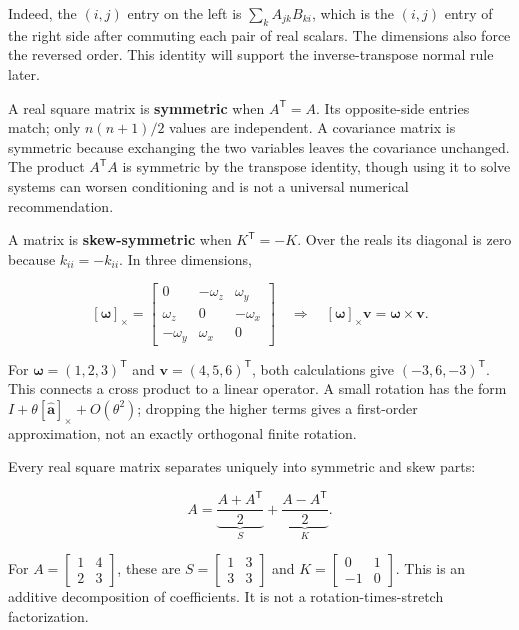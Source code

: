 Indeed, the \((i,j)\) entry on the left is \(\sum_kA_{jk}B_{ki}\), which is the \((i,j)\) entry of the right side after commuting each pair of real scalars. The dimensions also force the reversed order. This identity will support the inverse-transpose normal rule later.

A real square matrix is \textbf{symmetric} when \(A^{\mathsf T}=A\). Its opposite-side entries match; only \(n(n+1)/2\) values are independent. A covariance matrix is symmetric because exchanging the two variables leaves the covariance unchanged. The product \(A^{\mathsf T}A\) is symmetric by the transpose identity, though using it to solve systems can worsen conditioning and is not a universal numerical recommendation.

A matrix is \textbf{skew-symmetric} when \(K^{\mathsf T}=-K\). Over the reals its diagonal is zero because \(k_{ii}=-k_{ii}\). In three dimensions,

\[
[\boldsymbol\omega]_\times=
\begin{bmatrix}0&-\omega_z&\omega_y\\\omega_z&0&-\omega_x\\-\omega_y&\omega_x&0\end{bmatrix}
\quad\Longrightarrow\quad
[\boldsymbol\omega]_\times\mathbf v=\boldsymbol\omega\times\mathbf v.
\]

For \(\boldsymbol\omega=(1,2,3)^{\mathsf T}\) and \(\mathbf v=(4,5,6)^{\mathsf T}\), both calculations give \((-3,6,-3)^{\mathsf T}\). This connects a cross product to a linear operator. A small rotation has the form \(I+\theta[\widehat{\mathbf a}]_\times+O(\theta^2)\); dropping the higher terms gives a first-order approximation, not an exactly orthogonal finite rotation.

Every real square matrix separates uniquely into symmetric and skew parts:

\[
A=\underbrace{\frac{A+A^{\mathsf T}}2}_{S}
+\underbrace{\frac{A-A^{\mathsf T}}2}_{K}.
\]

For \(A=\begin{bmatrix}1&4\\2&3\end{bmatrix}\), these are \(S=\begin{bmatrix}1&3\\3&3\end{bmatrix}\) and \(K=\begin{bmatrix}0&1\\-1&0\end{bmatrix}\). This is an additive decomposition of coefficients. It is not a rotation-times-stretch factorization.

